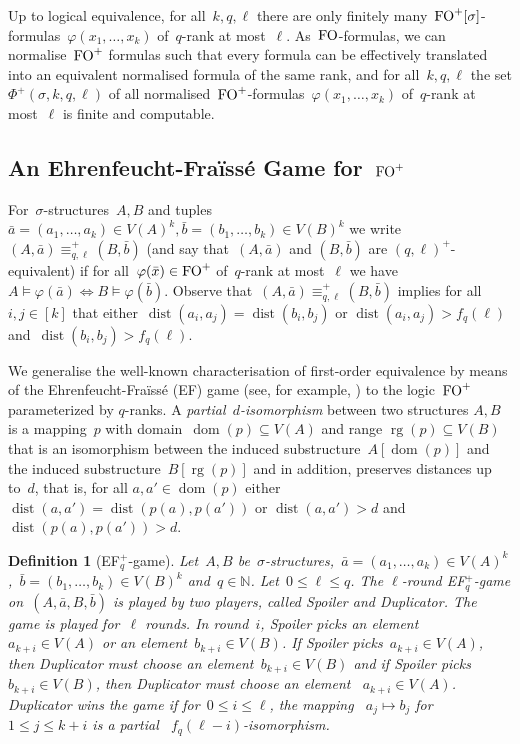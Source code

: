 \documentclass[11pt]{article}
\newtheorem{definition}[theorem]{Definition}
\numberwithin{equation}{section}
\newcommand{\N}{{\mathbb N}} \newcommand{\Q}{{\mathbb Q}}
\newcommand{\FO}{\textup{FO}}
\newcommand{\dist}{\operatorname{dist}}
\renewcommand{\phi}{\varphi}
\newcommand{\tup}[1]{\bar{#1}}
\newcommand{\dom}{\operatorname{dom}}
\newcommand{\rg}{\operatorname{rg}}
\begin{document}
Up to logical equivalence, for all~$k,q,\ell$ there are only finitely
many~$\FO^+[\sigma]$-formulas~$\phi(x_1,\ldots,x_k)$ of~$q$-rank at most~$\ell$. As~$\FO$-formulas, we can normalise~$\FO^+$
formulas such that
every formula can be effectively translated into an equivalent
normalised formula
of the same rank, and for all~$k,q,\ell$ the set
$\Phi^+(\sigma,k,q,\ell)$ of
all normalised~$\FO^+$-formulas~$\phi(x_1,\ldots,x_k)$ of~$q$-rank at
most~$\ell$
is finite and
computable.


\subsection{An Ehrenfeucht-Fra\"iss\'e Game for~$\FO^+$}

For~$\sigma$-structures~$A,B$ and tuples~$\tup a=(a_1,\ldots,a_k)\in
V(A)^k,\tup b=(b_1,\ldots,b_k)\in V(B)^k$ we write~$(A,\tup
a)\equiv^+_{q,\ell} (B,\tup b)$ (and say that~$(A,\tup a)$ and
$(B,\tup b)$ are
$(q,\ell)^+$-equivalent) if for all~$\phi(\tup x)\in\FO^+$ of~$q$-rank
at most~$\ell$ we have~$A\models\phi(\tup a)\iff B\models\phi(\tup
b)$. Observe that~$(A,\tup a)\equiv^+_{q,\ell} (B,\tup b)$ implies for
all~$i,j\in[k]$ that either~$\dist(a_i,a_j)=\dist(b_i,b_j)$ or
$\dist(a_i,a_j)>f_q(\ell)$ and~$\dist(b_i,b_j)>f_q(\ell)$.



We generalise the well-known characterisation of first-order
equivalence by means of the 
Ehrenfeucht-Fra\"iss\'e (EF) game (see, for example,
\cite{EbbinghausFluTho94}) to the logic~$\FO^+$ parameterized by
$q$-ranks. A \emph{partial~$d$-isomorphism} between two structures
$A,B$ is a mapping~$p$ with domain~$\dom(p)\subseteq V(A)$ and range
$\rg(p)\subseteq V(B)$ that is an isomorphism between the induced
substructure~$A[\dom(p)]$ and the induced substructure~$B[\rg(p)]$ and
in addition, preserves distances up to~$d$, that is, for all
$a,a'\in\dom(p)$ either~$\dist(a,a')=\dist(p(a),p(a'))$ or
$\dist(a,a')>d$ and~$\dist(p(a),p(a'))>d$. 

\begin{definition}[EF$_q^+$-game]\upshape
  Let~$A,B$ be~$\sigma$-structures,~$\tup{a}=(a_1,\ldots,a_k)\in V(A)^k$,~$\tup{b}=(b_1,\ldots,b_k)\in
  V(B)^k$ and~$q\in\N$. Let~$0\leq \ell\leq q$. The \emph{$\ell$-round
    EF$_q^+$-game} on~$(A, \tup a, B,\tup b)$ is played by
  two players, called \emph{Spoiler} and \emph{Duplicator}. The game
  is played for~$\ell$ rounds.  In round~$i$, Spoiler picks an element
 ~$a_{k+i}\in V(A)$ or an element~$b_{k+i}\in V(B)$. If Spoiler picks~$a_{k+i}\in
  V(A)$, then Duplicator must choose an element~$b_{k+i}\in V(B)$ and if
  Spoiler picks~$b_{k+i}\in V(B)$, then Duplicator must choose an element
 ~$a_{k+i}\in V(A)$. Duplicator wins
  the game if for~$0\leq i\leq \ell$, the mapping 
 ~$a_j\mapsto b_j$ for~$1\le j\le k+i$ is a partial
 ~$f_q(\ell-i)$-isomorphism.
\end{definition}
\end{document}
